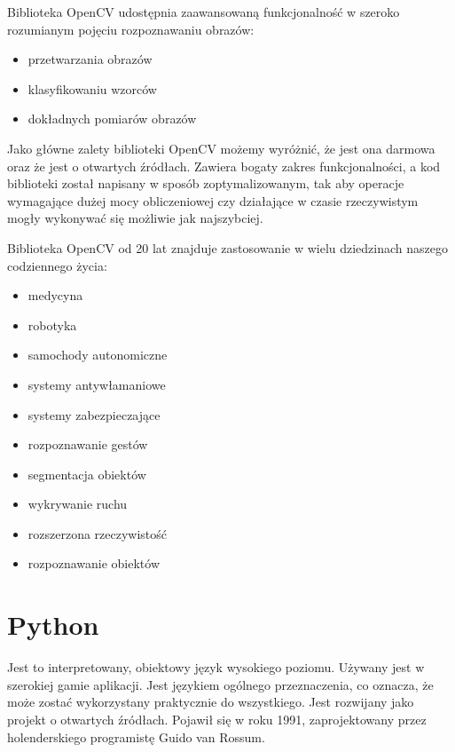 \documentclass[a4paper,12pt,twoside,openany]{report}
\begin{document}
Biblioteka OpenCV udostępnia zaawansowaną funkcjonalność  w szeroko rozumianym pojęciu rozpoznawaniu obrazów:

\begin{itemize}
	\item przetwarzania obrazów
	\item klasyfikowaniu wzorców
	\item dokładnych pomiarów obrazów
\end{itemize}

Jako główne zalety biblioteki OpenCV możemy wyróżnić, że jest ona darmowa oraz że jest o otwartych źródłach. Zawiera bogaty zakres funkcjonalności, a kod biblioteki został napisany w sposób zoptymalizowanym, tak aby operacje wymagające dużej mocy obliczeniowej czy działające w czasie rzeczywistym mogły wykonywać się możliwie jak najszybciej.

Biblioteka OpenCV od 20 lat znajduje zastosowanie w wielu dziedzinach naszego codziennego życia:
\begin{itemize} 
	\item medycyna
	\item robotyka
	\item samochody autonomiczne
	\item systemy antywłamaniowe 
	\item systemy zabezpieczające
	\item rozpoznawanie gestów
	\item segmentacja obiektów
	\item wykrywanie ruchu
	\item rozszerzona rzeczywistość
	\item rozpoznawanie obiektów
\end{itemize}

\section{Python}
Jest to interpretowany, obiektowy język wysokiego poziomu. Używany jest w szerokiej gamie  aplikacji. Jest językiem ogólnego przeznaczenia, co oznacza, że może zostać wykorzystany praktycznie do wszystkiego. Jest rozwijany jako projekt o otwartych źródłach. Pojawił się w roku 1991, zaprojektowany przez holenderskiego programistę Guido van Rossum\cite{python1}.  
\end{document}
